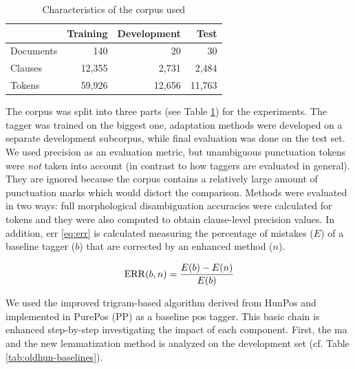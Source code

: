 \begin{table}[H]
\centering
\caption{Characteristics of the corpus used}\label{tab:oldhun-corpus}
\begin{tabular}{l r r r}
\hline
& Training & Development & Test \\
\hline
Documents & 140 & 20 & 30 \\
Clauses & 12,355 & 2,731 & 2,484 \\
Tokens & 59,926 & 12,656 &  11,763\\
\hline
\end{tabular}
\end{table}

The corpus was split into three parts (see Table \ref{tab:oldhun-corpus}) for the experiments. 
The tagger was trained on the biggest one, adaptation methods were developed on a separate development subcorpus, while final evaluation was done on the test set.
We used precision as an evaluation metric, but unambiguous punctuation tokens were \emph{not} taken into account (in contrast to how taggers are evaluated in general). 
They are ignored because the corpus contains a relatively large amount of punctuation marks which would distort the comparison.
Methods were evaluated in two ways: full morphological disambiguation accuracies were calculated for tokens and they were also computed to obtain clause-level precision values. 
In addition, \gls{err} \eqref{eq:err} is calculated measuring the percentage of mistakes ($E$) of a baseline tagger ($b$) that are corrected by an enhanced method ($n$). 

\begin{equation}\label{eq:err}
\operatorname{ERR}(b,n) = \frac{E(b)-E(n)}{E(b)}
\end{equation}

We used the improved trigram-based algorithm derived from HunPos and implemented in PurePos (PP) as a baseline \gls{pos} tagger. 
This basic chain is enhanced step-by-step investigating the impact of each component.
First, the \acrshort{ma} and the new lemmatization method is analyzed on the development set (cf. Table \ref{tab:oldhun-baselines}). 


